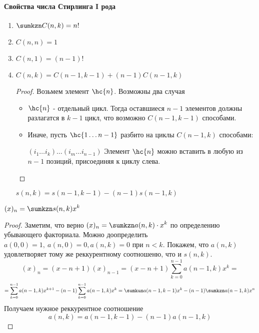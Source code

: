 \documentclass[unicode, 10pt, a4paper, oneside, fleqn]{article}
\begin{document}
\paragraph{Свойства числа Стирлинга I рода}
\begin{enumerate}
  \item $\displaystyle \sumkzn C(n,k) = n!$
  \item $C(n,n) =1$
  \item $ C(n,1) = (n-1)!$ \WHY
  \item $C(n,k) = C(n-1, k-1) + (n-1)C(n-1,k)$
    \begin{proof}
      Возьмем элемент $\hc{n}$. Возможны два случая
      \begin{itemize}
        \item $\hc{n}$ - отдельный цикл. Тогда оставшиеся $n-1$ элементов должны
          разлагатся в $k-1$ цикл, что возможно $C(n-1,k-1)$ способами.
        \item Иначе, пусть $\hc{1\dots n-1}$ разбито на циклы $C(n-1,k)$ способами:\par
          $(i_1\dots i_k)\dots(i_m\dots i_{n-1})$
          Элемент $\hc{n}$ можно вставить в любую из $n-1$ позиций, присоединяя к циклу слева.
      \end{itemize}
    \end{proof}
    \begin{imp}
      $\displaystyle s(n,k) = s(n-1,k-1) - (n-1)s(n-1,k)$
    \end{imp}
\end{enumerate}
\begin{lemma}
  $\displaystyle (x)_n =\sumkzn s(n,k)x^k$
\end{lemma}
\begin{proof}
  Заметим, что верно $\displaystyle (x)_n = \sumkzn a(n,k)\cdot x^k $ по определению убывающего
  факториала. Можно доопределить $a(0,0) =1,\ a(n,0)=0, a(n,k)=0 \text{ при } n<k $. 
  Покажем, что $a(n,k)$ удовлетворяет тому же реккурентному соотношеню, что и $s(n,k)$.
  \begin{displaymath}
    (x)_n = (x-n+1)(x)_{n-1} = (x-n+1)\sum_{k=0}^{n-1}a(n-1,k) x^k = 
  \end{displaymath}
  \begin{displaymath}
    =\sum_{k=0}^{n-1}a(n-1,k) x^{k+1} - (n-1)\sum_{k=0}^{n-1}a(n-1,k)x^k=\sumkun a(n-1,k-1)x^k 
    -(n-1)\sumkzn a(n-1,k) x^n
  \end{displaymath}
  Получаем нужное реккурентное соотношение 
  \begin{displaymath}
    a(n,k) = a(n-1, k-1) - (n-1)a(n-1,k)
  \end{displaymath}
\end{proof}
\end{document}
